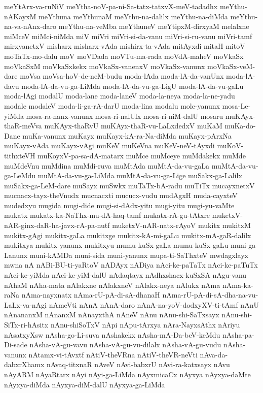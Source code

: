 {meYtArx-va-ruNiV
meYtha-noV-pa-ni-Sa-tatx-tatxvX-meV-tadadhx
meYthu-nAKayxM
meYthuna
meYthunaM
meYthu-na-dalilx
meYthu-na-diMda
meYthu-na-va-nAnx-daro
meYthu-na-veMba
meYthuneV
meYtipxM-dirxyaM
melalxne
miMceV
miMci-niMda
miV
miVri
miVri-si-da-vanu
miVri-si-ru-vanu
miVri-tamf
mirxyanetxV
misharx
misharx-vAda
mishirx-ta-vAda
mitAyxdi
mitaH
mitoV
moTaTx-mo-dalu
moV
moVDada
moVTu-ma-rada
moVdA-maheV
moVkaSx
moVkaSxM
moVkaSxkekx
moVkaSx-vanenxV
moVkaSx-vanunx
moVkaSx-veM-dare
moVsa
moVsa-hoV-de-neM-budu
moda-lAda
moda-lA-da-vanUnx
moda-lA-davu
moda-lA-da-vu-ga-LiMda
moda-lA-da-vu-ga-LigU
moda-lA-da-vu-gaLu
moda-lAgi
modalU
moda-lane
moda-laneV
moda-la-neya
moda-la-ne-yadu
modale
modaleV
moda-li-ga-rA-darU
moda-lina
modalu
mole-yanunx
mosa-Le-yiMda
mosa-ra-nanx-vanunx
mosa-ri-nalUlx
mosa-ri-niM-dalU
mosaru
muKAyx-thaR-meVva
muKAyx-thaRvU
muKAyx-thaR-vu-LaLxdedxV
muKaM
muKa-do-Dane
muKa-vanunx
muKayx
muKayx-kA-ra-Na-diMda
muKayx-pArxNa
muKayx-vAda
muKayx-vAgi
muKeV
muKeVna
muKeV-neV-tAyxdi
muKoV-tithxteVH
muKoyxV-pa-sa-dA-matarx
muMce
muMceye
muMdakekx
muMde
muMdeVnu
muMdina
muMdi-ruva
muMtAda
muMtA-da-vu-gaLa
muMtA-da-vu-ga-LeMdu
muMtA-da-vu-ga-LiMda
muMtA-da-vu-ga-Lige
muSakx-ga-Lalilx
muSakx-ga-LeM-dare
muSayx
muSwkx
muTaTx-bA-radu
muTiTx
mucayxnetxV
mucnacx-tayx-theVnudx
mucnacxti
mucucx-vudu
mudAgxH
muda-cayxteV
mudedxyu
mugida
mugi-dide
mugi-si-dAdx-yitu
mugi-yitu
mugi-yu-vaMte
mukatx
mukatx-ka-NaThx-mu-dA-haq-tamf
mukatx-rA-gu-tAtxre
muketxV-nAR-ginx-daR-ha-javx-rA-pa-nutf
muketxV-nAR-natx-rAyoV
mukitx
mukitxM
mukitx-gAgi
mukitx-gaLa
mukitxge
mukitx-kA-mi-gaLu
mukitx-mA-gaR-dalilx
mukitxya
mukitx-yanunx
mukitxyu
mumu-kuSx-gaLa
mumu-kuSx-gaLu
muni-ga-Lanunx
muni-kAMDa
muni-sida
muni-yanunx
mupa-ti-SaThxteV
mwdagxlayx
mwna
nA
nABi-BU-ti-yaRtoV
nADAyx
nADiya
nAci-ke-paTaTx
nAci-ke-paTuTx
nAci-ke-yiMda
nAci-ke-yiM-dalU
nAdaqtayx
nAdhxshacx-kuSxSA
nAgu-vanu
nAhaM
nAha-mata
nAlakxne
nAlakxneV
nAlakx-neya
nAlukx
nAma
nAma-ka-raNa
nAma-nayxnatx
nAma-rU-pA-di-sA-dhanaH
nAma-rU-pA-di-sA-dha-na-vu-LaLx-va-nAgi
nAmeVti
nAnA
nAnA-daro
nAnA-na-yoV-dodxyXV-ti-tAmf
nAnU
nAnananxM
nAnanxM
nAnayxthA
nAneV
nAnu
nAnu-shi-SaTxsayx
nAnu-shi-SiTx-ri-hAsitx
nAnu-shiSoTxV
nApi
nApu-tArxya
nAra-NayxsAthx
nAriyu
nAsatxyXsw
nAsha-go-Li-suva
nAshakekx
nAsha-mA-Da-beV-keMdu
nAsha-pa-Di-sade
nAsha-vA-gu-vavu
nAsha-vA-gu-vu-dilalx
nAsha-vA-gu-vudu
nAsha-vanunx
nAtamx-vi-tAvxtf
nAtiV-theVRna
nAtiV-theVR-neVti
nAva-da-dabxrXhamx
nAvaq-titxnaR
nAveV
nAvi-babxrU
nAvi-ra-katxsayx
nAvu
nAyARM
nAyaRtarx
nAyi
nAyi-ga-LiMda
nAyxmicaCx
nAyxya
nAyxya-daMte
nAyxya-diMda
nAyxya-diM-dalU
nAyxya-ga-LiMda
}
